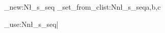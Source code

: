\ExplSyntaxOn
\seq_new:N\l_s_seq
\seq_set_from_clist:Nn\l_s_seq{a,b,c}

\seq_use:Nn\l_s_seq{|}
\ExplSyntaxOff
